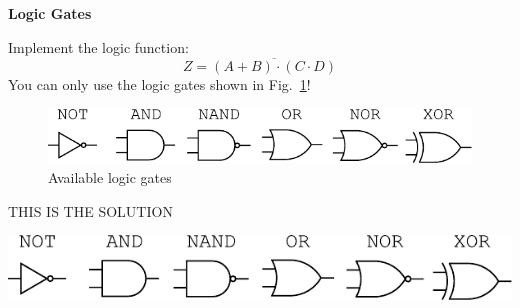 \question[3]
	\textbf{Logic Gates}

	Implement the logic function: $$Z=\overline{(A+B)\cdot(C\cdot D)}$$
	You can only use the logic gates shown in Fig.~\ref{fig:gates}!

	\begin{figure}[h]
		\centering
		\includegraphics{images/gates.pdf}
		\caption{Available logic gates}
		\label{fig:gates}
	\end{figure}

	\begin{solution}[5cm]
		THIS IS THE SOLUTION
		
		\ifprintanswers
			\includegraphics{images/gates.pdf}
			\label{fig:gates}
		\fi
		
	\end{solution}
